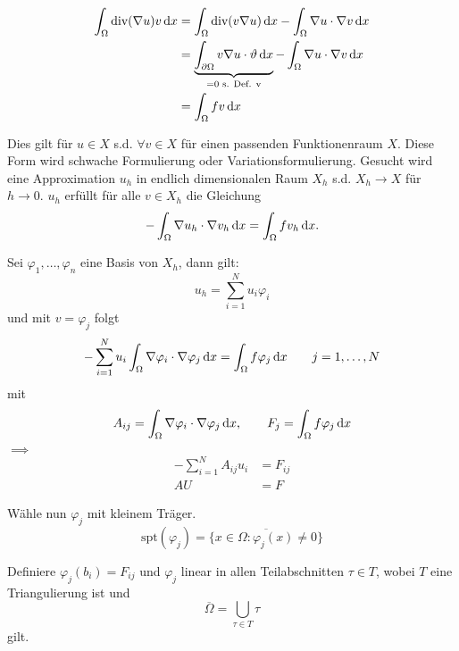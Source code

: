 \begin{align*}
	\int_\Omega \text{div}( \nabla u) v \mathop{}\!\mathrm{d} x
	 &= \int_\Omega \text{div}( v \nabla u ) \mathop{}\!\mathrm{d} x -	\int_\Omega \nabla u \cdot \nabla v \mathop{}\!\mathrm{d} x \\
	&=  \underbrace{\int_{\partial\Omega}  v \nabla u  \cdot \vartheta \mathop{}\!\mathrm{d} x}_{=0\text{ s. Def. v}} -	\int_\Omega \nabla u \cdot \nabla v \mathop{}\!\mathrm{d} x \\
	&=  \int_\Omega fv \mathop{}\!\mathrm{d} x
\end{align*}

Dies gilt für $u \in X$ s.d. $\forall v\in X$ f\"ur einen passenden Funktionenraum $X$.
Diese Form wird schwache Formulierung oder Variationsformulierung.
\enter
Gesucht wird eine Approximation $u_h$ in endlich dimensionalen Raum $X_h$ s.d. $X_h \to X$ f\"ur $h \to 0$.\enter
$u_h$ erf\"ullt f\"ur alle $v\in X_h$ die Gleichung
\begin{equation*}
	-	\int_\Omega \nabla u_h \cdot \nabla v_h \mathop{}\!\mathrm{d} x = \int_\Omega fv_h \mathop{}\!\mathrm{d} x.
\end{equation*}

Sei $\varphi_1,\dots, \varphi_n$ eine Basis von $X_h$, dann gilt:
\begin{equation*}
	u_h = \displaystyle\sum_{i=1}^N u_i\varphi_i 
\end{equation*}
und mit $v=\varphi_j$ folgt 
\begin{equation*}
	- \displaystyle\sum_{i=1}^N u_i \int_\Omega \nabla \varphi_i \cdot \nabla \varphi_j \mathop{}\!\mathrm{d} x = \int_\Omega f\varphi_j \mathop{}\!\mathrm{d} x \qquad j=1,\dots,N
\end{equation*}
mit 
\begin{align*}
	A_{ij} = \int_\Omega \nabla \varphi_i \cdot \nabla \varphi_j \mathop{}\!\mathrm{d} x, \quad \quad F_j = \int_\Omega f \varphi_j \mathop{}\!\mathrm{d} x
\end{align*}
$\implies$
\begin{align*}
	- \displaystyle\sum_{i=1}^N A_{ij}u_i &= F_{ij}\\
	AU &=F
\end{align*} 

W\"ahle nun $\varphi_j$ mit kleinem Tr\"ager.\enter
\begin{equation*}
	\text{spt}(\varphi_j) = \overline{\Big\{  x \in \Omega: \varphi_j(x) \neq 0 \Big\}}
\end{equation*}


Definiere $\varphi_j(b_i) = F_{ij}$ und $\varphi_j$ linear in allen Teilabschnitten $\tau \in T$, wobei $T$ eine Triangulierung ist und 
\begin{equation*}
	\overline{\Omega} = \bigcup\limits_{\tau\in T}\tau
\end{equation*}
gilt.

